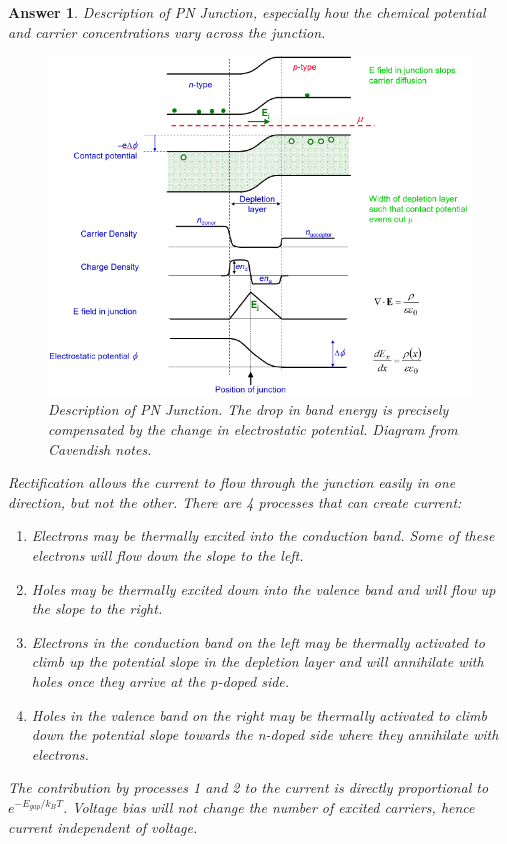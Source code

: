 \documentclass[a4paper]{article}
\newtheorem{ans}{Answer}[section]
\theoremstyle{new}
\begin{document}
\begin{ans}
Description of PN Junction, especially how the chemical potential and carrier concentrations vary across the junction.
\begin{figure}[H]
    \centering
    \includegraphics[width=\linewidth]{pnjunction.PNG}
    \caption{Description of PN Junction. The drop in band energy is precisely compensated by the change in electrostatic potential. Diagram from Cavendish notes.}
\end{figure}
Rectification allows the current to flow through the junction easily in one direction, but not the other. There are 4 processes that can create current:
\begin{enumerate}
    \item Electrons may be thermally excited into the conduction band. Some of these electrons will flow down the slope to the left.
    \item Holes may be thermally excited down into the valence band and will flow up the slope to the right. 
    \item Electrons in the conduction band on the left may be thermally activated to climb up the potential slope in the depletion layer and will annihilate with holes once they arrive at the p-doped side. 
    \item Holes in the valence band on the right may be thermally activated to climb down the potential slope towards the n-doped side where they annihilate with electrons.
\end{enumerate}
The contribution by processes 1 and 2 to the current is directly proportional to $e^{-E_{gap}/k_BT}$. Voltage bias will not change the number of excited carriers, hence current independent of voltage.\\[5pt]

\end{ans}
\end{document}
